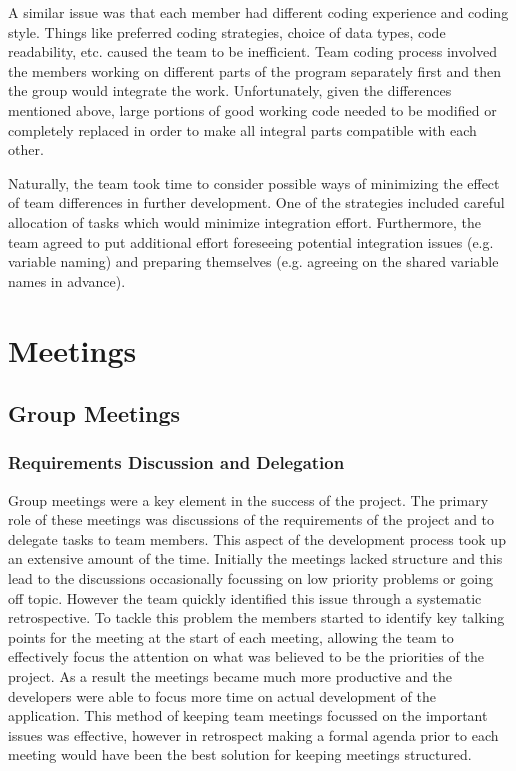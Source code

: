 \documentclass{l3proj}
\begin{document}
A similar issue was that each member had different coding experience and coding style. Things like preferred coding strategies, choice of data types, code readability, etc. caused the team to be inefficient. Team coding process involved the members working on different parts of the program separately first and then the group would integrate the work. Unfortunately, given the differences mentioned above, large portions of good working code needed to be modified or completely replaced in order to make all integral parts compatible with each other. 

Naturally, the team took time to consider possible ways of minimizing the effect of team differences in further development. One of the strategies included careful allocation of tasks which would minimize integration effort. Furthermore, the team agreed to put additional effort foreseeing potential integration issues (e.g. variable naming) and preparing themselves (e.g. agreeing on the shared variable names in advance).

\section{Meetings}
\label{sec:meetings}

\subsection{Group Meetings}
\subsubsection{Requirements Discussion and Delegation}
Group meetings were a key element in the success of the project. The primary role of these meetings was discussions of the requirements of the project and to delegate tasks to team members. This aspect of the development process took up an extensive amount of the time. Initially the meetings lacked structure and this lead to the discussions occasionally focussing on low priority problems or going off topic. However the team quickly identified this issue through a systematic retrospective. To tackle this problem the members started to identify key talking points for the meeting at the start of each meeting, allowing the team to effectively focus the attention on what was believed to be the priorities of the project. As a result the meetings became much more productive and the developers were able to focus more time on actual development of the application. This method of keeping team meetings focussed on the important issues was effective, however in retrospect making a formal agenda prior to each meeting would have been the best solution for keeping meetings structured.
\end{document}
